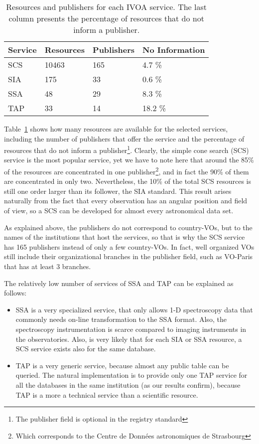 \begin{table}
\begin{center}
\begin{tabular}{|l|l|l|l|}
\hline
\textbf{Service} & \textbf{Resources} & \textbf{Publishers} & \textbf{No
Information} \\
\hline
SCS  &  10463 & 165 & 4.7 \% \\
SIA  &  175 & 33 & 0.6 \% \\
SSA  &  48  & 29 & 8.3 \% \\
TAP  &  33  & 14 & 18.2 \% \\
\hline
\end{tabular}
\label{tab:serviceRanking}
\caption{Resources and publishers for each IVOA service. The last column
presents the percentage of resources that do not inform a publisher.}
\end{center}
\end{table}

Table~\ref{tab:serviceRanking} shows how many resources are available for the
selected services, including the number of publishers that offer the service
and the percentage of resources that do not inform a publisher\footnote{The
publisher field is optional in the registry standard}. Clearly, the simple
cone search (SCS) service is the most popular service, yet we have to note
here that around the 85\% of the resources are concentrated in one publisher\footnote{Which corresponds to the Centre de Données astronomiques de Strasbourg},
and in fact the 90\% of them are concentrated in only two. Nevertheless, the 
10\% of the total SCS resources is still one order larger than its follower, 
the SIA standard. This result arises naturally from the fact that every
observation has an angular position and field of view, so a SCS can be 
developed for almost every astronomical data set.

As explained above, the publishers do not correspond to country-VOs, but 
to the names of the institutions that host the services, so that is why the SCS
service has 165 publishers instead of only a few country-VOs. In fact, well
organized VOs still include their organizational branches in the publisher field,
such as VO-Paris that has at least 3 branches.

The relatively low number of services of SSA and TAP can be explained as follows:
\begin{itemize}
\item SSA is a very specialized service, that only allows 1-D spectroscopy data that commonly 
needs on-line transformation to the SSA format. Also, the spectroscopy instrumentation is
scarce compared to imaging instruments in the observatories. Also, is very likely that for each
SIA or SSA resource, a SCS service exists also for the same database.
\item TAP is a very generic service, because almost any public table can be queried. 
The natural implementation is to provide only one TAP service for all the databases
in the same institution (as our results confirm), because TAP is a more a technical 
service than a scientific resource. 
\end{itemize} 

